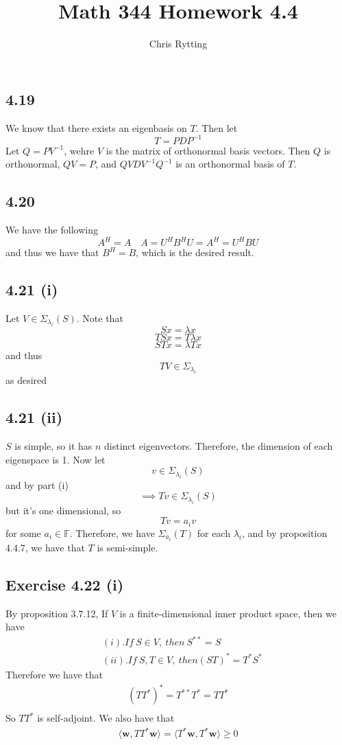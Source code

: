 \documentclass[letterpaper,12pt]{article}
\theoremstyle{definition}
\begin{document}
\title{Math 344 Homework 4.4}
\author{Chris Rytting}
\maketitle
\subsection*{4.19}
We know that there exists an eigenbasis on $T$. Then let
\[ T = PDP^{-1} \] 
Let $Q = PV^{-1}$, wehre $V$ is the matrix of orthonormal basis vectors. Then $Q$ is orthonormal, $QV = P$, and $QVDV^{-1}Q^{-1}$ is an orthonormal basis of $T$.

\subsection*{4.20}
We have the following
\[A^H = A \quad A = U^HB^HU = A^H = U^HBU\] and thus we have that $B^H =B$, which is the desired result.

\subsection*{4.21 (i)}
Let $V \in \Sigma_{\lambda_i}(S)$. Note that 
\[Sx = \lambda x\]
\[TSx = T\lambda x\]
\[STx = \lambda T x\]
and thus
\[TV \in \Sigma_{\lambda_i}\]
as desired

\subsection*{4.21 (ii)}
$S$ is simple, so it has $n$ distinct eigenvectors. Therefore, the dimension of each eigenspace is 1. Now let
\[v \in \Sigma_{\lambda_i}(S)\]
and by part (i)
\[\implies Tv \in \Sigma_{\lambda_i}(S)\]
but it's one dimensional, so 
\[Tv = a_iv\] for some $a_i \in \mathbb{F}$. Therefore, we have $\Sigma_{a_i}(T)$ for each $\lambda_i$, and by proposition 4.4.7, we have that $T$ is semi-simple.


\subsection*{Exercise 4.22 (i)}
By proposition 3.7.12, If $V$ is a finite-dimensional inner product space, then we have
\begin{align*}
&(i). If ~S \in V,~ then~ S^{**} = S\\
&(ii). If ~S,T \in V, ~then (ST)^* = T^*S^*
\end{align*}
Therefore we have that 
\begin{align*}
(TT^*)^* = T^{**}T^* = TT^* \\
\end{align*}
So $TT^*$ is self-adjoint. We also have that
\begin{align*}
\langle \mathbf{w}, TT^* \mathbf{w} \rangle = \langle T^* \mathbf{w}, T^* \mathbf{w} \rangle \geq 0
\end{align*}
\end{document}
